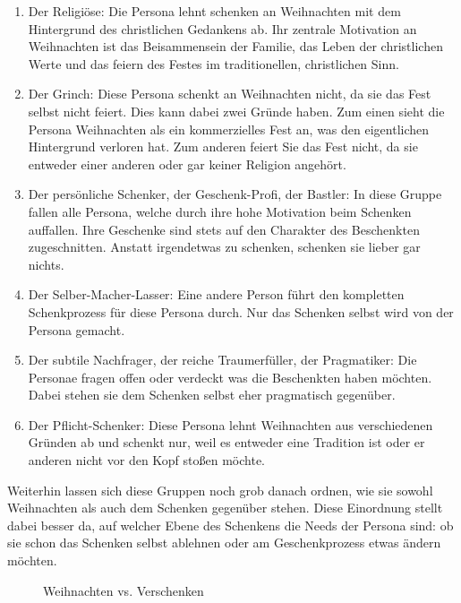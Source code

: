 \documentclass[12pt,ngerman, fleqn]{book} %
\begin{document}
\begin{enumerate}
    \item Der Religiöse: Die Persona lehnt schenken an Weihnachten mit dem Hintergrund des christlichen Gedankens ab. Ihr zentrale Motivation an Weihnachten ist das Beisammensein der Familie, das Leben der christlichen Werte und das feiern des Festes im traditionellen, christlichen Sinn.
    
    \item Der Grinch: Diese Persona schenkt an Weihnachten nicht, da sie das Fest selbst nicht feiert. Dies kann dabei zwei Gründe haben. Zum einen sieht die Persona Weihnachten als ein kommerzielles Fest an, was den eigentlichen Hintergrund verloren hat. Zum anderen feiert Sie das Fest nicht, da sie entweder einer anderen oder gar keiner Religion angehört.
    
    \item Der persönliche Schenker, der Geschenk-Profi, der Bastler: In diese Gruppe fallen alle Persona, welche durch ihre hohe Motivation beim Schenken auffallen. Ihre Geschenke sind stets auf den Charakter des Beschenkten zugeschnitten. Anstatt irgendetwas zu schenken, schenken sie lieber gar nichts.

    \item Der Selber-Macher-Lasser: Eine andere Person führt den kompletten Schenkprozess für diese Persona durch. Nur das Schenken selbst wird von der Persona gemacht.
    
    \item Der subtile Nachfrager, der reiche Traumerfüller, der Pragmatiker: Die Personae fragen offen oder verdeckt was die Beschenkten haben möchten. Dabei stehen sie dem Schenken selbst eher pragmatisch gegenüber.
    
    \item Der Pflicht-Schenker: Diese Persona lehnt Weihnachten aus verschiedenen Gründen ab und schenkt nur, weil es entweder eine Tradition ist oder er anderen nicht vor den Kopf stoßen möchte.\\
\end{enumerate}

Weiterhin lassen sich diese Gruppen noch grob danach ordnen, wie sie sowohl Weihnachten als auch dem Schenken gegenüber stehen. Diese Einordnung stellt dabei besser da, auf welcher Ebene des Schenkens die Needs der Persona sind: ob sie schon das Schenken selbst ablehnen oder am Geschenkprozess etwas ändern möchten.

\begin{figure}[ht]
    \centering
    \caption{Weihnachten vs. Verschenken}
    \label{fig:positiv}
\end{figure}
\end{document}
